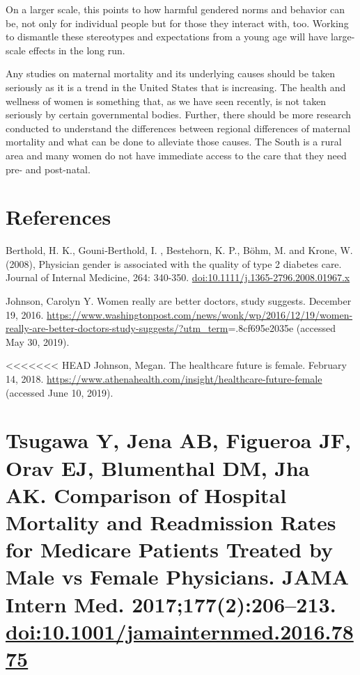 \documentclass[11pt,]{article}
\begin{document}
On a larger scale, this points to how harmful gendered norms and
behavior can be, not only for individual people but for those they
interact with, too. Working to dismantle these stereotypes and
expectations from a young age will have large-scale effects in the long
run.

Any studies on maternal mortality and its underlying causes should be
taken seriously as it is a trend in the United States that is
increasing. The health and wellness of women is something that, as we
have seen recently, is not taken seriously by certain governmental
bodies. Further, there should be more research conducted to understand
the differences between regional differences of maternal mortality and
what can be done to alleviate those causes. The South is a rural area
and many women do not have immediate access to the care that they need
pre- and post-natal.

\section{References}\label{references}

Berthold, H. K., Gouni‐Berthold, I. , Bestehorn, K. P., Böhm, M. and
Krone, W. (2008), Physician gender is associated with the quality of
type 2 diabetes care. Journal of Internal Medicine, 264: 340-350.
\url{doi:10.1111/j.1365-2796.2008.01967.x}

Johnson, Carolyn Y. Women really are better doctors, study suggests.
December 19, 2016.
\url{https://www.washingtonpost.com/news/wonk/wp/2016/12/19/women-really-are-better-doctors-study-suggests/?utm_term}=.8cf695e2035e
(accessed May 30, 2019).

\textless{}\textless{}\textless{}\textless{}\textless{}\textless{}\textless{}
HEAD Johnson, Megan. The healthcare future is female. February 14, 2018.
\url{https://www.athenahealth.com/insight/healthcare-future-female}
(accessed June 10, 2019).

\section{\texorpdfstring{Tsugawa Y, Jena AB, Figueroa JF, Orav EJ,
Blumenthal DM, Jha AK. Comparison of Hospital Mortality and Readmission
Rates for Medicare Patients Treated by Male vs Female Physicians. JAMA
Intern Med. 2017;177(2):206--213.
\url{doi:10.1001/jamainternmed.2016.7875}}{Tsugawa Y, Jena AB, Figueroa JF, Orav EJ, Blumenthal DM, Jha AK. Comparison of Hospital Mortality and Readmission Rates for Medicare Patients Treated by Male vs Female Physicians. JAMA Intern Med. 2017;177(2):206--213. doi:10.1001/jamainternmed.2016.7875}}\label{tsugawa-y-jena-ab-figueroa-jf-orav-ej-blumenthal-dm-jha-ak.-comparison-of-hospital-mortality-and-readmission-rates-for-medicare-patients-treated-by-male-vs-female-physicians.-jama-intern-med.-20171772206213.-doi10.1001jamainternmed.2016.7875}
\end{document}
